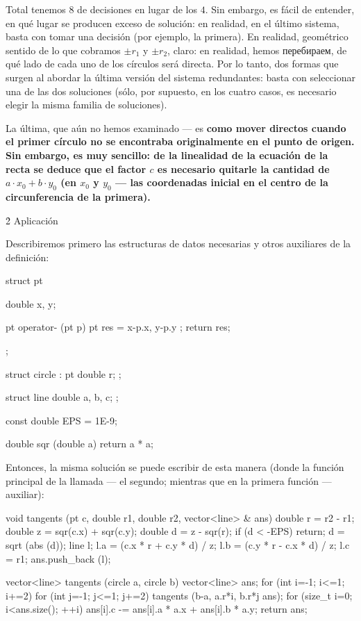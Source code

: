 Total tenemos $8$ de decisiones en lugar de los $4$. Sin embargo, es fácil de entender, en qué lugar se producen exceso de solución: en realidad, en el último sistema, basta con tomar una decisión (por ejemplo, la primera). En realidad, geométrico sentido de lo que cobramos $\pm r_1$ y $\pm r_2$, claro: en realidad, hemos перебираем, de qué lado de cada uno de los círculos será directa. Por lo tanto, dos formas que surgen al abordar la última versión del sistema redundantes: basta con seleccionar una de las dos soluciones (sólo, por supuesto, en los cuatro casos, es necesario elegir la misma familia de soluciones).

La última, que aún no hemos examinado --- es \bf{como mover directos} cuando el primer círculo no se encontraba originalmente en el punto de origen. Sin embargo, es muy sencillo: de la linealidad de la ecuación de la recta se deduce que el factor $c$ es necesario quitarle la cantidad de $a \cdot x_0 + b \cdot y_0$ (en $x_0$ y $y_0$ --- las coordenadas inicial en el centro de la circunferencia de la primera).


\h2{ Aplicación }

Describiremos primero las estructuras de datos necesarias y otros auxiliares de la definición:

\code
struct pt {
double x, y;

pt operator- (pt p) {
pt res = { x-p.x, y-p.y };
return res;
}
};

struct circle : pt {
double r;
};

struct line {
double a, b, c;
};

const double EPS = 1E-9;

double sqr (double a) {
return a * a;
}
\endcode

Entonces, la misma solución se puede escribir de esta manera (donde la función principal de la llamada --- el segundo; mientras que en la primera función --- auxiliar):

\code
void tangents (pt c, double r1, double r2, vector<line> & ans) {
double r = r2 - r1;
double z = sqr(c.x) + sqr(c.y);
double d = z - sqr(r);
if (d < -EPS) return;
d = sqrt (abs (d));
line l;
l.a = (c.x * r + c.y * d) / z;
l.b = (c.y * r - c.x * d) / z;
l.c = r1;
ans.push_back (l);
}

vector<line> tangents (circle a, circle b) {
vector<line> ans;
for (int i=-1; i<=1; i+=2)
for (int j=-1; j<=1; j+=2)
tangents (b-a, a.r*i, b.r*j ans);
for (size_t i=0; i<ans.size(); ++i)
ans[i].c -= ans[i].a * a.x + ans[i].b * a.y;
return ans;
}
\endcode





